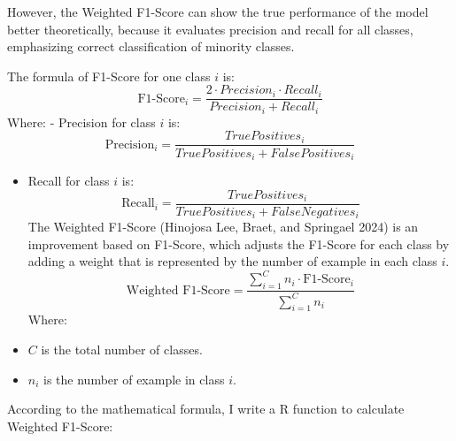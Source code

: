 \documentclass[
]{article}
\providecommand{\tightlist}{%
  \setlength{\itemsep}{0pt}\setlength{\parskip}{0pt}}
\begin{document}
However, the Weighted F1-Score can show the true performance of the
model better theoretically, because it evaluates precision and recall
for all classes, emphasizing correct classification of minority classes.

The formula of F1-Score for one class \(i\) is: \[
\text{F1-Score}_i = \frac{2 \cdot Precision_i \cdot Recall_i}{Precision_i + Recall_i}
\] Where: - Precision for class \(i\) is: \[
\text{Precision}_i = \frac{True Positives_i}{True Positives_i + False Positives_i}
\]

\begin{itemize}
\tightlist
\item
  Recall for class \(i\) is: \[
  \text{Recall}_i = \frac{True Positives_i}{True Positives_i + False Negatives_i}
  \] The Weighted F1-Score (Hinojosa Lee, Braet, and Springael 2024) is
  an improvement based on F1-Score, which adjusts the F1-Score for each
  class by adding a weight that is represented by the number of example
  in each class \(i\). \[
  \text{Weighted F1-Score} = \frac{\sum_{i=1}^C n_i \cdot \text{F1-Score}_i}{\sum_{i=1}^C n_i}
  \] Where:
\item
  \(C\) is the total number of classes.
\item
  \(n_i\) is the number of example in class \(i\).
\end{itemize}

According to the mathematical formula, I write a R function to calculate
Weighted F1-Score:
\end{document}
